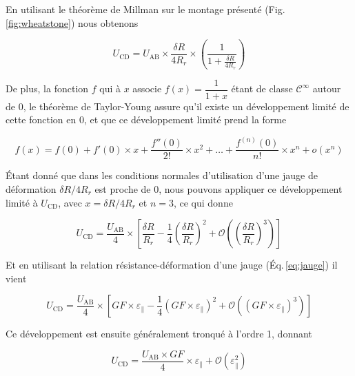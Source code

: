 

 En utilisant le théorème de Millman sur le montage présenté (Fig.\,\ref{fig:wheatstone}) nous obtenons
 
\begin{equation}
U_{\mathrm{CD}} = U_{\mathrm{AB}}
	\times
\dfrac{\delta R}{4R_r}
	\times
\left(
	\dfrac{1}{1+\frac{\delta R}{4R_r}}
\right)
\end{equation}

De plus, la fonction $f$ qui à $x$ associe $f(x)=\dfrac{1}{1+x}$ étant de classe $\mathcal{C}^\infty$ autour de 0, le théorème de Taylor-Young assure qu'il existe un développement limité de cette fonction en 0, et que ce développement limité prend la forme

\begin{equation}
f(x) = f(0) + f'(0)\times x + \dfrac{f''(0)}{2!}\times x^2 +\dots+  \dfrac{f^{(n)}(0)}{n!}\times x^n  + o(x^n)
\end{equation}

Étant donné que dans les conditions normales d'utilisation d'une jauge de déformation ${\delta R}/{4R_r}$ est proche de 0,  nous pouvons appliquer ce développement limité à $U_{\mathrm{CD}}$, avec $x={\delta R}/{4R_r}$ et $n=3$, ce qui donne

\begin{equation}
U_{\mathrm{CD}}= \dfrac{U_{\mathrm{AB}}}{4}
	\times
\left[
	\dfrac{\delta R}{R_r}
		-
	\dfrac{1}{4}\left(\dfrac{\delta R}{R_r}\right)^2
		+
	\mathcal{O}
		\left(
			\left(\dfrac{\delta R}{R_r}\right)^3
		\right)
\right]
\end{equation}

Et en utilisant la relation résistance-déformation d'une jauge (Éq.\,\ref{eq:jauge}) il vient

\begin{equation}
U_{\mathrm{CD}}= \dfrac{U_{\mathrm{AB}}}{4}
	\times
\left[
	GF\times\varepsilon_{\parallel}
		-
	\dfrac{1}{4}\left(GF\times\varepsilon_{\parallel}\right)^2
		+
	\mathcal{O}
		\left(
			\left(GF\times\varepsilon_{\parallel}\right)^3
		\right)
\right]
\end{equation}

Ce développement est ensuite généralement tronqué à l'ordre 1, donnant

\begin{equation}
U_{\mathrm{CD}}= \dfrac{U_{\mathrm{AB}}\times GF}{4} \times \varepsilon_{\parallel} +
	\mathcal{O}\left( \varepsilon_{\parallel}^2 \right)
\end{equation}



